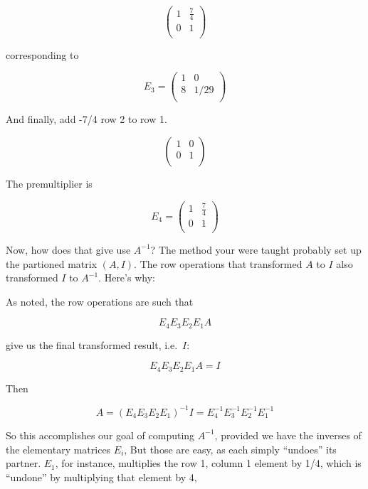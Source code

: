 \documentclass[
  letterpaper,
  DIV=11,
  numbers=noendperiod,
  oneside]{scrreprt}
\begin{document}
\[
 \left (
 \begin{array}{rr}
 1 & \frac{7}{4} \\
 0 & 1  \\
 \end{array}
 \right )
 \]

corresponding to

\[
E_3=
\left (
\begin{array}{rr}
1 & 0  \\
8 & 1/29  \\
\end{array}
\right )
\]

And finally, add -7/4 row 2 to row 1.

\[
 \left (
 \begin{array}{rr}
 1 & 0 \\
 0 & 1  \\
 \end{array}
 \right )
 \]

The premultiplier is

\[
E_4 =
 \left (
 \begin{array}{rr}
 1 & \frac{7}{4} \\
 0 & 1  \\
 \end{array}
 \right )
 \]

Now, how does that give use \(A^{-1}\)? The method your were taught
probably set up the partioned matrix \((A,I)\). The row operations that
transformed \(A\) to \(I\) also transformed \(I\) to \(A^{-1}\). Here's
why:

As noted, the row operations are such that

\[
E_4 E_3 E_2 E_1 A 
\]

give us the final transformed result, i.e.~\(I\):

\[
E_4 E_3 E_2 E_1 A = I
\]

Then{}

\[
A = (E_4 E_3 E_2 E_1)^{-1} I = E_4^{-1} E_3^{-1} E_2^{-1} E_1^{-1}
\]

So this accomplishes our goal of computing \(A^{-1}\), provided we have
the inverses of the elementary matrices \(E_i\), But those are easy, as
each simply ``undoes'' its partner. \(E_1\), for instance, multiplies
the row 1, column 1 element by 1/4, which is ``undone'' by multiplying
that element by 4,
\end{document}

